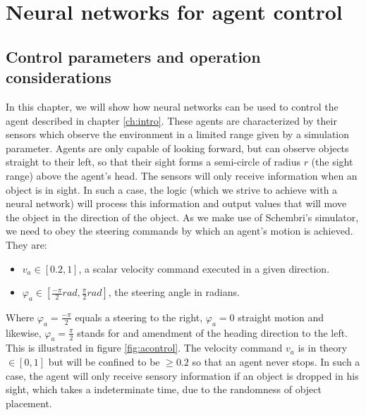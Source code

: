 \documentclass[10pt,a4paper,DIV=11]{scrreprt}
\begin{document}
\chapter{Neural networks for agent control}
\label{ch:design}

\section{Control parameters and operation considerations}
In this chapter, we will show how neural networks can be used to control the agent described in chapter \ref{ch:intro}. These agents are 
characterized by their sensors which observe the environment in a limited range given by a simulation parameter. Agents are only capable 
of looking forward, but can observe
objects straight to their left, so that their sight forms a semi-circle of radius $r$ (the sight range) above the agent's head. The sensors will only 
receive information when an object is in sight. In such a case, the logic (which we strive to achieve with a neural network) will process
this information and output values that will move the object in the direction of the object. As we make use
of Schembri's simulator, we need to obey the steering commands by which an agent's motion is achieved. They are:

\begin{itemize}
    \item $v_a \in [0.2,1]$, a scalar velocity command executed in a given direction.
    \item $\varphi_a \in [\frac{-\pi}{2} rad, \frac{\pi}{2} rad]$, the steering angle in radians.
\end{itemize}

Where $\varphi_a = \frac{-\pi}{2}$ equals a steering to the right, $\varphi_a = 0$ straight motion and likewise, $\varphi_a = \frac{\pi}{2}$ stands for and amendment
of the heading direction to the left.
This is illustrated in figure \ref{fig:acontrol}. The velocity command $v_a$ is in theory $ \in [0,1]$ but will be confined to be $\geq 0.2$ so that
an agent never stops. In such a case, the agent will only receive sensory information if an object is dropped in his sight, which takes a indeterminate
time, due to the randomness of object placement.
\end{document}
